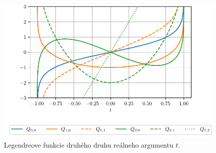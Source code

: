 \documentclass[a4paper,12pt]{book}
\begin{document}
\begin{figure}
\centering
\includegraphics{./fig-legendre-functions-qnm.pdf}
\caption{Legendreove funkcie druhého druhu reálneho argumentu $t$.}
\label{fig:lf_2nd}
\end{figure}
\end{document}
